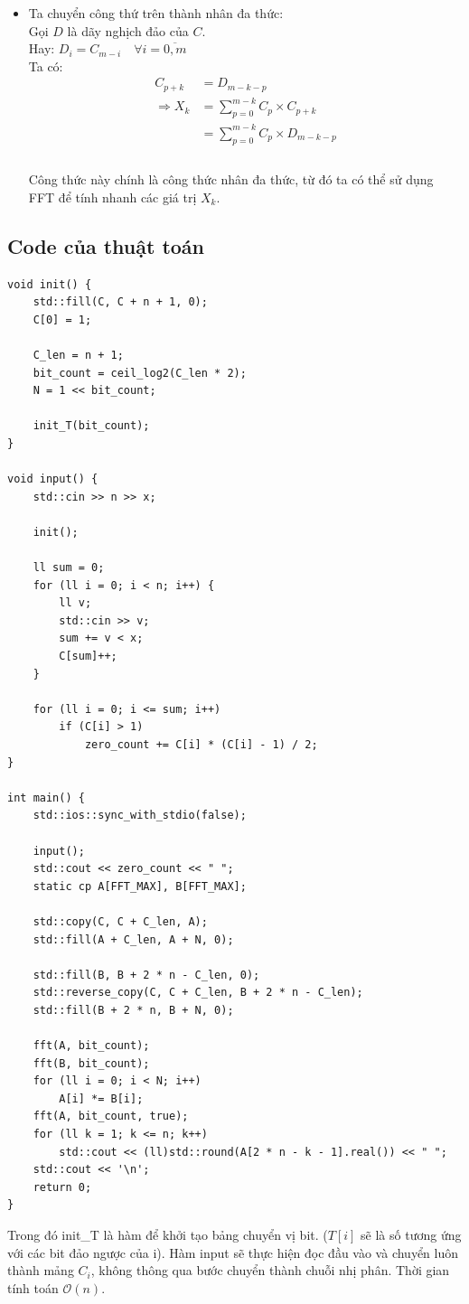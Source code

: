 \documentclass[../report.tex]{subfiles}
\begin{document}
\begin{itemize}
\item Ta chuyển công thứ trên thành nhân đa thức: \\
Gọi $D$ là dãy nghịch đảo của $C$. \\
Hay: $D_i = C_{m - i} \quad\forall i = \overline{0, m}$ \\
Ta có:
\begin{align*}
    C_{p + k} &= D_{m - k - p} \\
    \Rightarrow X_k &= \sum_{p = 0}^{m - k} C_{p} \times C_{p + k}\\
    &= \sum_{p = 0}^{m - k} C_{p} \times D_{m - k - p}\\
\end{align*}\\
Công thức này chính là công thức nhân đa thức, từ đó ta có thể 
sử dụng FFT để tính nhanh các giá trị $X_k$. 
\end{itemize}

\subsection{Code của thuật toán}
\begin{lstlisting}
void init() {
    std::fill(C, C + n + 1, 0);
    C[0] = 1;

    C_len = n + 1;
    bit_count = ceil_log2(C_len * 2);
    N = 1 << bit_count;

    init_T(bit_count);
}

void input() {
    std::cin >> n >> x;

    init();

    ll sum = 0;
    for (ll i = 0; i < n; i++) {
        ll v;
        std::cin >> v;
        sum += v < x;
        C[sum]++;
    }

    for (ll i = 0; i <= sum; i++)
        if (C[i] > 1) 
            zero_count += C[i] * (C[i] - 1) / 2;
}

int main() {
    std::ios::sync_with_stdio(false);

    input();
    std::cout << zero_count << " ";
    static cp A[FFT_MAX], B[FFT_MAX];

    std::copy(C, C + C_len, A);
    std::fill(A + C_len, A + N, 0);

    std::fill(B, B + 2 * n - C_len, 0);
    std::reverse_copy(C, C + C_len, B + 2 * n - C_len);
    std::fill(B + 2 * n, B + N, 0);

    fft(A, bit_count);
    fft(B, bit_count);
    for (ll i = 0; i < N; i++)
        A[i] *= B[i];
    fft(A, bit_count, true);
    for (ll k = 1; k <= n; k++)
        std::cout << (ll)std::round(A[2 * n - k - 1].real()) << " ";
    std::cout << '\n';
    return 0;
}
\end{lstlisting}
Trong đó init\_T là hàm để khởi tạo bảng chuyển vị bit. 
($T[i]$ sẽ là số tương ứng với các bit đảo ngược của i). 
Hàm input sẽ thực hiện đọc đầu vào và chuyển luôn thành mảng 
$C_i$, không thông qua bước chuyển thành chuỗi nhị phân. Thời gian 
tính toán $\mathcal{O}(n)$.
\end{document}
